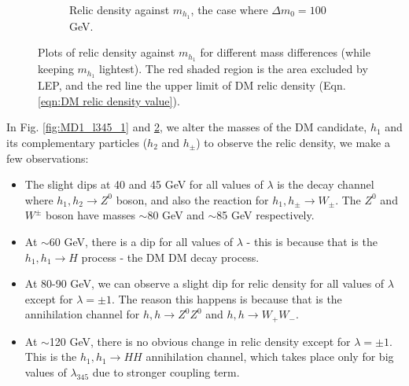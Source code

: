 \documentclass[12pt]{article}
\begin{document}
\begin{figure}[H]
\begin{subfigure}[b]{0.49\textwidth}
        \caption{Relic density against $m_{h_1}$, the case where $\Delta m_0 = 100$ GeV.}
        \label{fig:MD1_l345_100}
    \end{subfigure}
    \caption{Plots of relic density against $m_{h_1}$ for different mass differences (while keeping $m_{h_1}$ lightest). The red shaded region is the area excluded by LEP, and the red line the upper limit of DM relic density (Eqn. \ref{eqn:DM relic density value}).}
\end{figure}

In Fig. \ref{fig:MD1_l345_1} and \ref{fig:MD1_l345_100}, we alter the masses of the DM candidate, $h_1$ and its complementary particles ($h_2$ and $h_{\pm}$) to observe the relic density, we make a few observations:
\begin{itemize}
    \item The slight dips at 40 and 45 GeV for all values of $\lambda$ is the decay channel where $h_1, h_2 \rightarrow Z^0$ boson, and also the reaction for $h_1, h_{\pm} \rightarrow W_\pm$. The $Z^0$ and $W^\pm$ boson have masses $\sim$80 GeV and $\sim$85 GeV respectively.
    \item At $\sim$60 GeV, there is a dip for all values of $\lambda$ - this is because that is the $h_1,h_1\rightarrow H$ process - the DM DM decay process. 
    \item At 80-90 GeV, we can observe a slight dip for relic density for all values of $\lambda$ except for $\lambda = \pm1$. The reason this happens is because that is the annihilation channel for $h, h \rightarrow Z^0Z^0$ and $h, h \rightarrow W_+ W_-$.
    \item At $\sim$120 GeV, there is no obvious change in relic density except for $\lambda = \pm1$. This is the $h_1,h_1\rightarrow H H$ annihilation channel, which takes place only for big values of $\lambda_{345}$ due to stronger coupling term.
\end{itemize}
\end{document}
